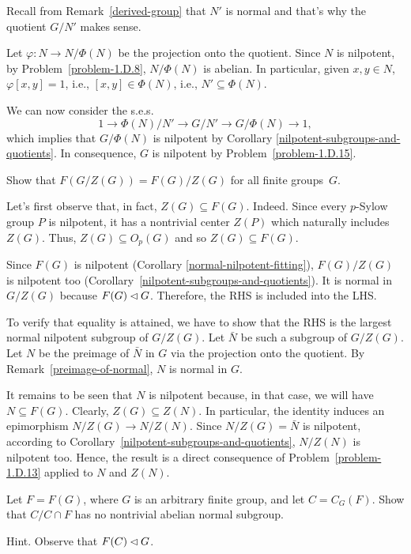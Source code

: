\begin{solution} Recall from Remark~\ref{derived-group} that $N'$ is normal and that's why the quotient $G/N'$ makes sense.

Let $\varphi\colon N\to N/\Phi(N)$ be the projection onto the quotient. Since $N$ is nilpotent, by Problem~\ref{problem-1.D.8}, $N/\Phi(N)$ is abelian. In particular, given $x,y\in N$, $\varphi[x,y]=1$, i.e., $[x,y]\in\Phi(N)$, i.e., $N'\subseteq\Phi(N)$.

We can now consider the s.e.s.
$$
    1\to \Phi(N)/N'\to G/N'\to G/\Phi(N)\to 1,
$$
which implies that $G/\Phi(N)$ is nilpotent by Corollary \ref{nilpotent-subgroups-and-quotients}. In consequence, $G$ is nilpotent by Problem~\ref{problem-1.D.15}.

\end{solution}

\begin{probl}
    Show that $F(G/Z(G)) = F(G)/Z(G)$ for all finite groups~$G$.
\end{probl}

\begin{solution} Let's first observe that, in fact, $Z(G)\subseteq F(G)$. Indeed. Since every $p$-Sylow group $P$ is nilpotent, it has a nontrivial center $Z(P)$ which naturally includes $Z(G)$. Thus, $Z(G)\subseteq O_p(G)$ and so $Z(G)\subseteq F(G)$.

Since $F(G)$ is nilpotent (Corollary \ref{normal-nilpotent-fitting}), $F(G)/Z(G)$ is nilpotent too (Corollary~\ref{nilpotent-subgroups-and-quotients}). It is normal in $G/Z(G)$ because $F(G)\lhd G$. Therefore, the RHS is included into the LHS.

To verify that equality is attained, we have to show that the RHS is the largest normal nilpotent subgroup of $G/Z(G)$. Let $\bar N$ be such a subgroup of $G/Z(G)$. Let $N$ be the preimage of $\bar N$ in $G$ via the projection onto the quotient. By Remark~\ref{preimage-of-normal}, $N$ is normal in $G$.

It remains to be seen that $N$ is nilpotent because, in that case, we will have $N\subseteq F(G)$. Clearly, $Z(G)\subseteq Z(N)$. In particular, the identity induces an epimorphism $N/Z(G)\to N/Z(N)$. Since $N/Z(G)=\bar N$ is nilpotent, according to Corollary~\ref{nilpotent-subgroups-and-quotients}, $N/Z(N)$ is nilpotent too. Hence, the result is a direct consequence of Problem~\ref{problem-1.D.13} applied to $N$ and $Z(N)$.  \end{solution}

\begin{probl}\label{problem-1.D.19}
    Let $F = F(G)$, where $G$ is an arbitrary finite group, and let $C = C_G(F)$. Show that $C/C\cap F$ has no nontrivial abelian normal subgroup.

    \textrm{\rm Hint. Observe that $F(C)\lhd G$.}
\end{probl}

